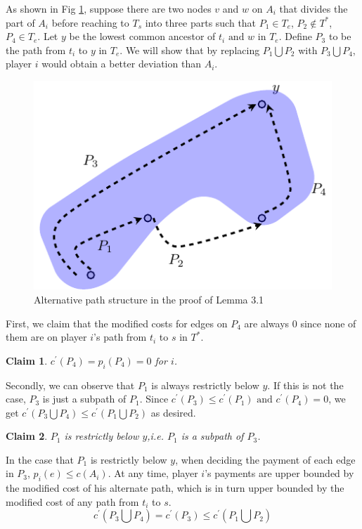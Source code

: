 \documentclass[11pt,psfig,times]{article}
\newtheorem{claim}{Claim}
\begin{document}
As shown in Fig \ref{fig:alterpath}, suppose there are two nodes \(v\) and \(w\) on \(A_i\) that divides the part of $A_i$ before reaching to $T_s$ into three parts such that \(P_1 \in T_e\), \(P_2 \notin T^*\), \(P_4 \in T_e\). Let $y$ be the lowest common ancestor of $t_i \text{ and } w \text{ in } T_e$. Define $P_3$ to be the path from $t_i$ to $y$ in $T_e$. We will show that by replacing $P_1 \bigcup P_2$ with $P_3 \bigcup P_4$, player $i$ would obtain a better deviation than $A_i$.
		\begin{figure}		
		\begin{center}
		\includegraphics{pictures/alterpath.pdf}
		\end{center}
		\caption{Alternative path structure in the proof of Lemma 3.1}
		\label{fig:alterpath}
	\end{figure}

First, we claim that the modified costs for edges on $P_4$ are always 0 since none of them are on player $i$'s path from $t_i$ to $s$ in $T^*$.
		\begin{claim}
			$ c^{'}(P_4) = p_i(P_4) = 0$ for $i$.
		\end{claim}
Secondly, we can observe that $P_1$ is always restrictly below $y$. If this is not the case, $P_3$ is just a subpath of $P_1$. Since $c^{'}(P_3) \leq c^{'}(P_1) \text{ and } c^{'}(P_4) = 0$, we get $ c^{'}(P_3\bigcup P_4) \leq c^{'}(P_1\bigcup P_2)$ as desired.  	
		\begin{claim}
		$P_1$ is restrictly below $y$,i.e. $P_1$ is a subpath of $P_3$. 
		\end{claim}

In the case that $P_1$ is restrictly below $y$,
when deciding the payment of each edge in $P_3$, $p_i(e) \leq c(A_i)$. At any time, player $i$'s payments are upper bounded by the modified cost of his alternate path, which is in turn upper bounded by the modified cost of any path from $t_i$ to $s$. 
			 \[ c^{'}(P_3\bigcup P_4) = c^{'}(P_3) \leq c^{'}(P_1\bigcup P_2)\]
	
\end{document}
